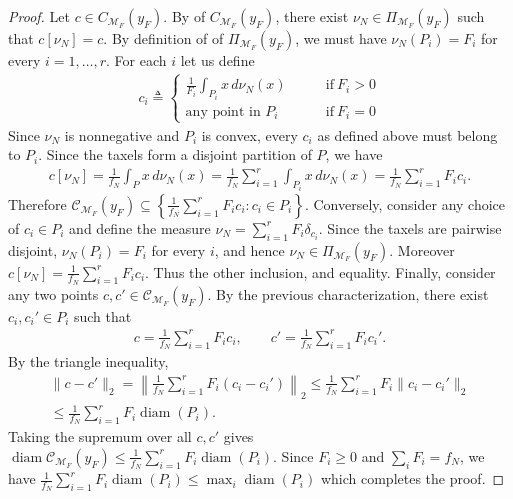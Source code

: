 \documentclass[11pt,a4paper]{article}
\theoremstyle{proposition}
\begin{document}
\begin{proof}
  Let $c\in C_{\mathcal M_F}(y_F)$. By of $C_{\mathcal M_F}(y_F)$, there exist $\nu_N\in\Pi_{\mathcal M_F}(y_F)$ such that $c[\nu_N]=c$. By definition of of $\Pi_{\mathcal M_F}(y_F)$, we must have $\nu_N(P_i)=F_i$ for every $i=1,\ldots,r$. For each $i$ let us define
\begin{align}
    c_i \triangleq \begin{cases}
                        \frac{1}{F_i}\int_{P_i}x\,d\nu_N(x) \qquad &\text{if}~F_i >0\\
                        \text{any point in $P_i$}~ \qquad &\text{if}~ F_i=0
                    \end{cases}
\end{align}
Since $\nu_N$ is nonnegative and $P_i$ is convex, every $c_i$ as defined above must belong to $P_i$. Since the taxels form a disjoint partition of $P$, we have
\begin{align}
    c[\nu_N]
    =
    \frac{1}{f_N}\int_P x\,d\nu_N(x)
    =
    \frac{1}{f_N}\sum_{i=1}^r
    \int_{P_i}x\,d\nu_N(x)
    =
    \frac{1}{f_N}\sum_{i=1}^r F_i c_i.
\end{align}
Therefore $\mathcal C_{\mathcal M_F}(y_F)    \subseteq    \left\{    \frac{1}{f_N}\sum_{i=1}^rF_i c_i: c_i\in P_i    \right\}$.  Conversely, consider any choice of $c_i\in P_i$ and define the measure $\nu_N=\sum_{i=1}^r F_i\delta_{c_i}$. Since the taxels are pairwise disjoint, $\nu_N(P_i)=F_i$ for every $i$, and hence
$\nu_N\in\Pi_{\mathcal M_F}(y_F)$.
Moreover $
    c[\nu_N]
    =
    \frac{1}{f_N}\sum_{i=1}^rF_i c_i$. 
Thus the other inclusion, and equality. Finally, consider any two points
$c,c'\in\mathcal C_{\mathcal M_F}(y_F)$.
By the previous characterization, there exist $c_i,c_i'\in P_i$ such that
\begin{align}
    c=\frac{1}{f_N}\sum_{i=1}^rF_i c_i,
    \qquad
    c'=\frac{1}{f_N}\sum_{i=1}^rF_i c_i'.
\end{align}
By the triangle inequality,
\begin{align}
    \|c-c'\|_2
    =
    \left\|
    \frac{1}{f_N}
    \sum_{i=1}^rF_i(c_i-c_i')
    \right\|_2 \le
    \frac{1}{f_N}
    \sum_{i=1}^rF_i\|c_i-c_i'\|_2\\
    \le
    \frac{1}{f_N}
    \sum_{i=1}^rF_i\operatorname{diam}(P_i).
\end{align}
Taking the supremum over all $c,c'$ gives $\operatorname{diam}\mathcal C_{\mathcal M_F}(y_F)\le\frac{1}{f_N}\sum_{i=1}^rF_i\operatorname{diam}(P_i)$. Since $F_i\ge0$ and $\sum_iF_i=f_N$, we have  $\frac{1}{f_N}\sum_{i=1}^rF_i\operatorname{diam}(P_i)\le\max_i\operatorname{diam}(P_i)$ which completes the proof.
\end{proof}
\end{document}
